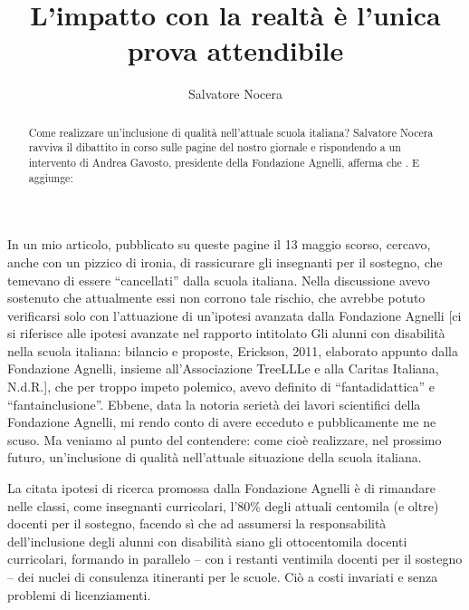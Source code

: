 \author{Salvatore Nocera}
\title{L'impatto con la realtà è l'unica prova attendibile }
\label{cha:nocera280513}
\begin{abstract}
Come realizzare un'inclusione di qualità nell'attuale scuola italiana? Salvatore Nocera ravviva il dibattito in corso sulle pagine del nostro giornale e rispondendo a un intervento di Andrea Gavosto, presidente della Fondazione Agnelli, afferma che . E aggiunge: 
\end{abstract}
\maketitle
{}
In un mio articolo\pageref{cha:nocera130513}, pubblicato su queste pagine il 13 maggio scorso, cercavo, anche con un pizzico di ironia, di rassicurare gli insegnanti per il sostegno, che temevano di essere “cancellati” dalla scuola italiana. Nella discussione avevo sostenuto che attualmente essi non corrono tale rischio, che avrebbe potuto verificarsi solo con l'attuazione di un'ipotesi avanzata dalla Fondazione Agnelli [ci si riferisce alle ipotesi avanzate nel rapporto intitolato Gli alunni con disabilità nella scuola italiana: bilancio e proposte, Erickson, 2011, elaborato appunto dalla Fondazione Agnelli, insieme all'Associazione TreeLLLe e alla Caritas Italiana, N.d.R.], che per troppo impeto polemico, avevo definito di “fantadidattica” e “fantainclusione”. Ebbene, data la notoria serietà dei lavori scientifici della Fondazione Agnelli, mi rendo conto di avere ecceduto e pubblicamente me ne scuso.
Ma veniamo al punto del contendere: come cioè realizzare, nel prossimo futuro, un'inclusione di qualità nell'attuale situazione della scuola italiana.

La citata ipotesi di ricerca promossa dalla Fondazione Agnelli è di rimandare nelle classi, come insegnanti curricolari, l'80\% degli attuali centomila (e oltre) docenti per il sostegno, facendo sì che ad assumersi la responsabilità dell'inclusione degli alunni con disabilità siano gli ottocentomila docenti curricolari, formando in parallelo – con i restanti ventimila docenti per il sostegno – dei nuclei di consulenza itineranti per le scuole. Ciò a costi invariati e senza problemi di licenziamenti.

